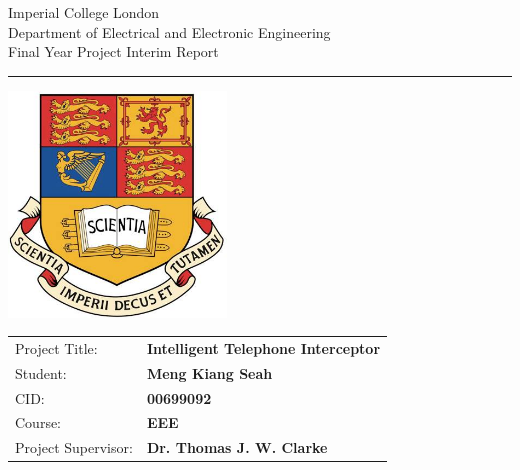 \documentclass[11pt,a4paper]{report}
\begin{document}
\begin{titlepage}
                \setlength{\parindent}{0pt}
                \setlength{\parskip}{0pt}

                {
                                \Large
                                \raggedright
                                Imperial College London\\[17pt]
                                Department of Electrical and Electronic Engineering\\[17pt]
                                Final Year Project Interim Report\\[17pt]

                }

                \rule{\columnwidth}{3pt}
                \vfill
                \centering
                  \includegraphics[width=0.7\columnwidth,height=60mm,keepaspectratio]{icl.jpg}
                \vfill
                \setlength{\tabcolsep}{0pt}

                \begin{tabular}{p{40mm}p{\dimexpr\columnwidth-40mm}}
                                Project Title: & \textbf{Intelligent Telephone Interceptor} \\[12pt]
                                Student: & \textbf{Meng Kiang Seah} \\[12pt]
                                CID: & \textbf{00699092} \\[12pt]
                                Course: & \textbf{EEE} \\[12pt]
                                Project Supervisor: & \textbf{Dr. Thomas J. W. Clarke} \\[12pt]
                \end{tabular}
\end{titlepage}
\end{document}
